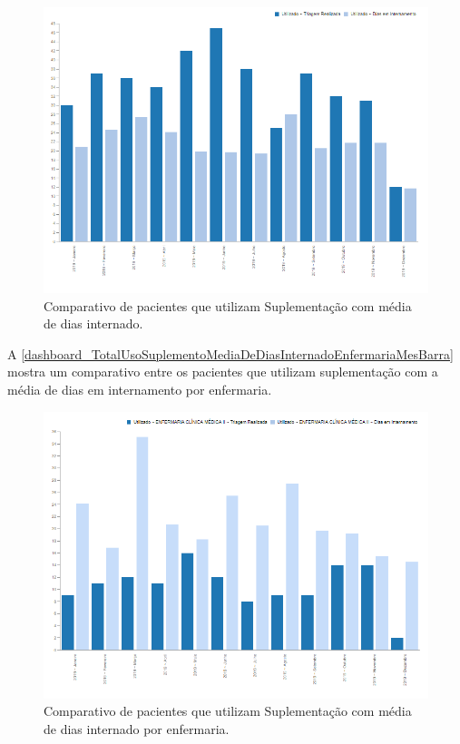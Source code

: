 \begin{figure}[htb]
	\caption{\label{dashboard_TotalUsoSuplementoMediaDeDiasInternadoHospitalMesBarra}Comparativo de pacientes que utilizam Suplementação com média de dias internado.}
	\begin{center}
	    \includegraphics[scale=0.35]{Imagens/6.1.TotalUsoSuplementoMediaDeDiasInternadoHospitalMesBarra.png}
	\end{center}
\end{figure}

A \autoref{dashboard_TotalUsoSuplementoMediaDeDiasInternadoEnfermariaMesBarra} mostra um comparativo entre os pacientes que utilizam suplementação com a média de dias em internamento por enfermaria.

\begin{figure}[htb]
	\caption{\label{dashboard_TotalUsoSuplementoMediaDeDiasInternadoEnfermariaMesBarra}Comparativo de pacientes que utilizam Suplementação com média de dias internado por
enfermaria.}
	\begin{center}
	    \includegraphics[scale=0.35]{Imagens/6.2.TotalUsoSuplementoMediaDeDiasInternadoEnfermariaMesBarra.png}
	\end{center}
\end{figure}

